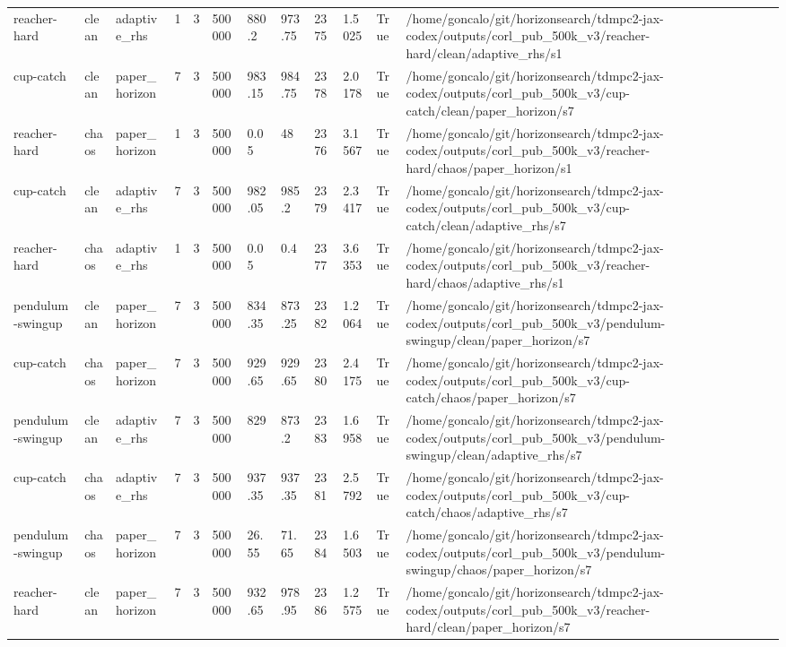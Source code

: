 \begin{tabular}{llllllllllll}
reacher-hard & clean & adaptive\_rhs & 1 & 3 & 500000 & 880.2 & 973.75 & 2375 & 1.5025 & True & /home/goncalo/git/horizonsearch/tdmpc2-jax-codex/outputs/corl\_pub\_500k\_v3/reacher-hard/clean/adaptive\_rhs/s1 \\
cup-catch & clean & paper\_horizon & 7 & 3 & 500000 & 983.15 & 984.75 & 2378 & 2.0178 & True & /home/goncalo/git/horizonsearch/tdmpc2-jax-codex/outputs/corl\_pub\_500k\_v3/cup-catch/clean/paper\_horizon/s7 \\
reacher-hard & chaos & paper\_horizon & 1 & 3 & 500000 & 0.05 & 48 & 2376 & 3.1567 & True & /home/goncalo/git/horizonsearch/tdmpc2-jax-codex/outputs/corl\_pub\_500k\_v3/reacher-hard/chaos/paper\_horizon/s1 \\
cup-catch & clean & adaptive\_rhs & 7 & 3 & 500000 & 982.05 & 985.2 & 2379 & 2.3417 & True & /home/goncalo/git/horizonsearch/tdmpc2-jax-codex/outputs/corl\_pub\_500k\_v3/cup-catch/clean/adaptive\_rhs/s7 \\
reacher-hard & chaos & adaptive\_rhs & 1 & 3 & 500000 & 0.05 & 0.4 & 2377 & 3.6353 & True & /home/goncalo/git/horizonsearch/tdmpc2-jax-codex/outputs/corl\_pub\_500k\_v3/reacher-hard/chaos/adaptive\_rhs/s1 \\
pendulum-swingup & clean & paper\_horizon & 7 & 3 & 500000 & 834.35 & 873.25 & 2382 & 1.2064 & True & /home/goncalo/git/horizonsearch/tdmpc2-jax-codex/outputs/corl\_pub\_500k\_v3/pendulum-swingup/clean/paper\_horizon/s7 \\
cup-catch & chaos & paper\_horizon & 7 & 3 & 500000 & 929.65 & 929.65 & 2380 & 2.4175 & True & /home/goncalo/git/horizonsearch/tdmpc2-jax-codex/outputs/corl\_pub\_500k\_v3/cup-catch/chaos/paper\_horizon/s7 \\
pendulum-swingup & clean & adaptive\_rhs & 7 & 3 & 500000 & 829 & 873.2 & 2383 & 1.6958 & True & /home/goncalo/git/horizonsearch/tdmpc2-jax-codex/outputs/corl\_pub\_500k\_v3/pendulum-swingup/clean/adaptive\_rhs/s7 \\
cup-catch & chaos & adaptive\_rhs & 7 & 3 & 500000 & 937.35 & 937.35 & 2381 & 2.5792 & True & /home/goncalo/git/horizonsearch/tdmpc2-jax-codex/outputs/corl\_pub\_500k\_v3/cup-catch/chaos/adaptive\_rhs/s7 \\
pendulum-swingup & chaos & paper\_horizon & 7 & 3 & 500000 & 26.55 & 71.65 & 2384 & 1.6503 & True & /home/goncalo/git/horizonsearch/tdmpc2-jax-codex/outputs/corl\_pub\_500k\_v3/pendulum-swingup/chaos/paper\_horizon/s7 \\
reacher-hard & clean & paper\_horizon & 7 & 3 & 500000 & 932.65 & 978.95 & 2386 & 1.2575 & True & /home/goncalo/git/horizonsearch/tdmpc2-jax-codex/outputs/corl\_pub\_500k\_v3/reacher-hard/clean/paper\_horizon/s7 \\

\end{tabular}
